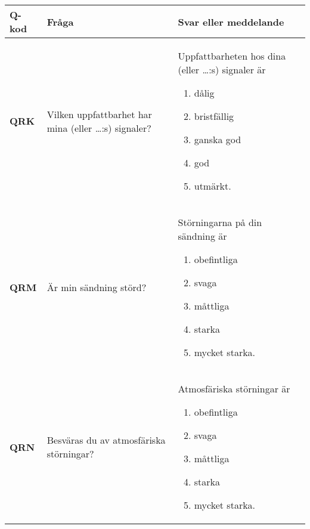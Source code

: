 \begin{table*}
  \begin{threeparttable}
  \begin{tabular}{lp{6cm}p{6cm}}
    \textbf{Q-kod} & \textbf{Fråga} & \textbf{Svar eller meddelande} \\
    \hline
    \textbf{QRK} & Vilken uppfattbarhet har mina
                   (eller \dots:s)\tnote{*} signaler? &
                   Uppfattbarheten hos dina (eller \dots:s)\tnote{*} signaler är
                   \vspace{-\topsep}
                   \begin{enumerate}[noitemsep]
                       \item dålig
                       \item bristfällig
                       \item ganska god
                       \item god
                       \item utmärkt.
                   \end{enumerate} \\
    \textbf{QRM} & Är min sändning störd? &
                   Störningarna på din sändning är
                   \vspace{-\topsep}
                   \begin{enumerate}[noitemsep]
                       \item obefintliga
                       \item svaga
                       \item måttliga
                       \item starka
                       \item mycket starka.
                   \end{enumerate} \\
    \textbf{QRN} & Besväras du av atmosfäriska störningar? &
                   Atmosfäriska störningar är
                   \vspace{-\topsep}
                   \begin{enumerate}[noitemsep]
                       \item obefintliga
                       \item svaga
                       \item måttliga
                       \item starka
                       \item mycket starka.

\end{enumerate}
\end{tabular}
\end{threeparttable}
\end{table*}
